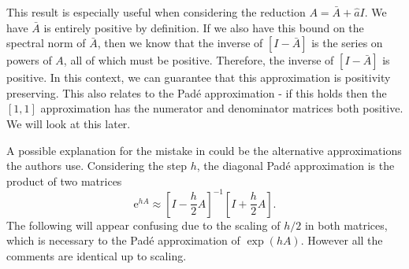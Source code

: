This result is especially useful when considering the reduction $A = \bar{A} + \hat{a}I$.
We have $\bar{A}$ is entirely positive by definition.
If we also have this bound on the spectral norm of $\bar{A}$,
then we know that the inverse of $[I-\bar{A}]$ is the series on powers of $A$, all of which must be positive.
Therefore, the inverse of $[I-\bar{A}]$ is positive.
In this context, we can guarantee that this approximation is positivity preserving.
This also relates to the Pad\'e approximation - if this holds then the $[1,1]$ approximation has the numerator and denominator matrices both positive.
We will look at this later.

A possible explanation for the mistake in \cite{blanes_pos_2022} could be the alternative approximations the authors use.
Considering the step $h$, the diagonal Pad\'e approximation is the product of two matrices
\begin{equation*}
    \mathrm{e}^{hA} \approx \left[ I - \frac{h}{2} A \right]^{-1} \left[ I + \frac{h}{2}A \right].
\end{equation*}
The following will appear confusing due to the scaling of $h/2$ in both matrices, which is necessary to the Pad\'e approximation of $\exp(hA)$.
However all the comments are identical up to scaling.


